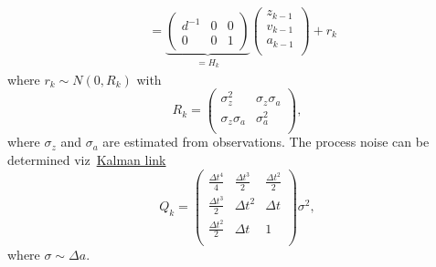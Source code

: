 \begin{example}
\begin{equation}
\begin{split}
			&= \underbrace{\begin{pmatrix}
					d^{-1} & 0 & 0\\
					0 & 0 & 1 
			\end{pmatrix}}_{=H_k}\begin{pmatrix}
				z_{k-1}\\ v_{k-1} \\ a_{k-1}\\
			\end{pmatrix}+r_k
		\end{split}
	\end{equation}
	where $r_k \sim N(0,R_k)$ with 
	\begin{equation}
		R_k = \begin{pmatrix}
			\sigma_z^2 & \sigma_z\sigma_a\\
			\sigma_z\sigma_a & \sigma_a^2 \\
		\end{pmatrix},
	\end{equation}
	where $\sigma_z$ and $\sigma_a$ are estimated from observations. The process noise can be determined viz~\href{https://github.com/rlabbe/Kalman-and-Bayesian-Filters-in-Python/blob/master/07-Kalman-Filter-Math.ipynb}{Kalman link}
	\begin{equation}
		Q_k = \begin{pmatrix}
			\frac{\Delta t^4}{4} & \frac{\Delta t^3}{2} & \frac{\Delta t^2}{2}\\
			\frac{\Delta t^3}{2} & \Delta t^2 & \Delta t\\
			\frac{\Delta t^2}{2} & \Delta t & 1\\
		\end{pmatrix}\sigma^2,
	\end{equation}
	where $\sigma \sim \Delta a$.
\end{example}
